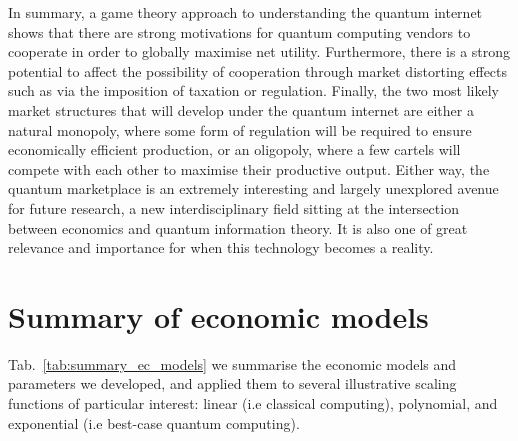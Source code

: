 In summary, a game theory approach to understanding the quantum internet shows that there are strong motivations for quantum computing vendors to cooperate in order to globally maximise net utility. Furthermore, there is a strong potential to affect the possibility of cooperation through market distorting effects such as via the imposition of taxation or regulation. Finally, the two most likely market structures that will develop under the quantum internet are either a natural monopoly, where some form of regulation will be required to ensure economically efficient production, or an oligopoly, where a few cartels will compete with each other to maximise their productive output. Either way, the quantum marketplace is an extremely interesting and largely unexplored avenue for future research, a new interdisciplinary field sitting at the intersection between economics and quantum information theory. It is also one of great relevance and importance for when this technology becomes a reality.


%
%

\section{Summary of economic models}\label{sec:summary_economic_models}

 Tab.~\ref{tab:summary_ec_models} we summarise the economic models and parameters we developed, and applied them to several illustrative scaling functions of particular interest: linear (i.e classical computing), polynomial, and exponential (i.e best-case quantum computing).


\startnormtable
\renewcommand{\arraystretch}{0.5}

